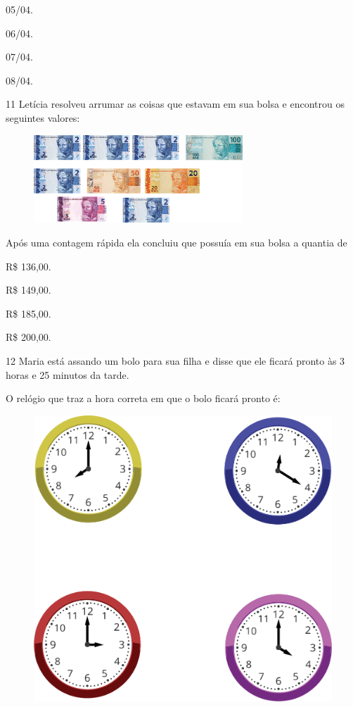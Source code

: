 \begin{multicols}{2}
\begin{escolha}
\item
  05/04.
\item
  06/04.
\item
  07/04.
\item
  08/04.
\end{escolha}
\end{multicols}

\num{11} Letícia resolveu arrumar as coisas que estavam em sua bolsa e encontrou os seguintes valores:

\begin{figure}[htpb!]
\centering
\includegraphics[width=0.7\textwidth]{./media/image110.png}
\end{figure}

Após uma contagem rápida ela concluiu que possuía em sua bolsa a quantia de

\begin{escolha}
\item
  R\$ 136,00.
\item
  R\$ 149,00.
\item
  R\$ 185,00.
\item
  R\$ 200,00.
\end{escolha}


\num{12} Maria está assando um bolo para sua filha e disse que ele ficará pronto às 3 horas e 25 minutos da tarde.

O relógio que traz a hora correta em que o bolo ficará pronto é:

\begin{figure}[htpb!]
\centering
\includegraphics[width=.45\textwidth]{./media/image111.png}
\end{figure}

